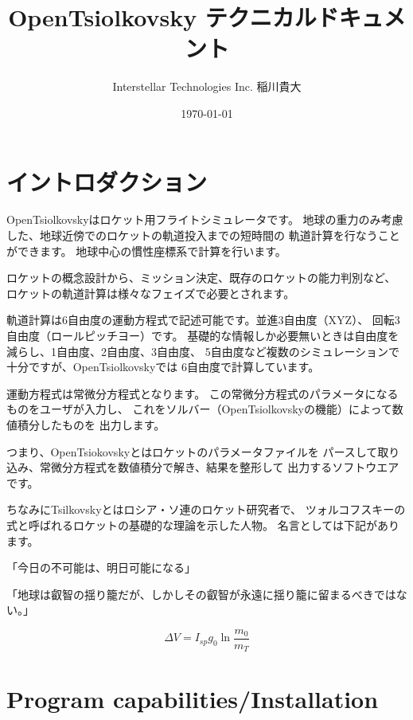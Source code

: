 \documentclass[12pt]{jsarticle}
\title{OpenTsiolkovsky テクニカルドキュメント}
\author{Interstellar Technologies Inc. 稲川貴大}
\date{\today}
\begin{document}
\maketitle
\begin{abstract}

\end{abstract}

\tableofcontents

\newpage
\section{イントロダクション}
OpenTsiolkovskyはロケット用フライトシミュレータです。
地球の重力のみ考慮した、地球近傍でのロケットの軌道投入までの短時間の
軌道計算を行なうことができます。
地球中心の慣性座標系で計算を行います。

ロケットの概念設計から、ミッション決定、既存のロケットの能力判別など、
ロケットの軌道計算は様々なフェイズで必要とされます。

軌道計算は6自由度の運動方程式で記述可能です。並進3自由度（XYZ）、
回転3自由度（ロールピッチヨー）です。
基礎的な情報しか必要無いときは自由度を減らし、1自由度、2自由度、3自由度、
5自由度など複数のシミュレーションで十分ですが、OpenTsiolkovskyでは
6自由度で計算しています。

運動方程式は常微分方程式となります。
この常微分方程式のパラメータになるものをユーザが入力し、
これをソルバー（OpenTsiolkovskyの機能）によって数値積分したものを
出力します。

つまり、OpenTsiokovskyとはロケットのパラメータファイルを
パースして取り込み、常微分方程式を数値積分で解き、結果を整形して
出力するソフトウエアです。

ちなみにTsilkovskyとはロシア・ソ連のロケット研究者で、
ツォルコフスキーの式と呼ばれるロケットの基礎的な理論を示した人物。
名言としては下記があります。

「今日の不可能は、明日可能になる」

「地球は叡智の揺り籠だが、しかしその叡智が永遠に揺り籠に留まるべきではない。」

\begin{equation}
\Delta V = I_{sp} g_{0} \ln \frac{m_0}{m_T}
\end{equation}


\section{Program capabilities/Installation}
\end{document}
